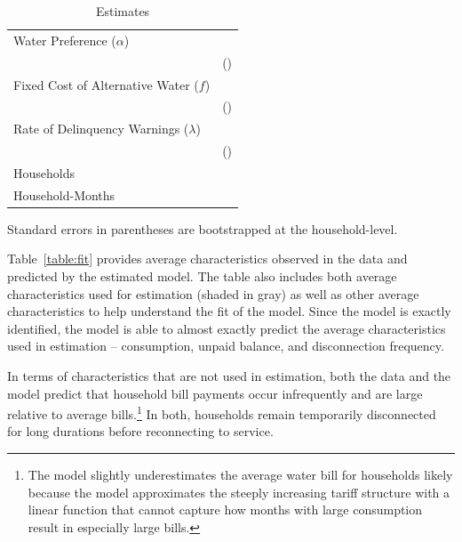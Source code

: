 \documentclass[12pt,table]{article}
\begin{document}
\begin{table}[h!]
\centering
\caption{Estimates}\label{table:estimates}
\begin{threeparttable}
\begin{tabular}{@{}l*{1}{c}@{}}
\toprule
Water Preference  ($\alpha$) &  \\
 &   (\unskip) \\[.4em]
Fixed Cost of Alternative Water ($f$) &   \\
 &    (\unskip) \\[.4em]
Rate of Delinquency Warnings ($\lambda$) &   \\
 &   (\unskip) \\[.8em]
Households &   \\
Household-Months &   \\
\bottomrule
\end{tabular}
\begin{tablenotes}
\item 
\footnotesize
Standard errors in parentheses are bootstrapped at the household-level. 
\end{tablenotes}
\end{threeparttable}
\end{table}

Table~\ref{table:fit} provides average characteristics observed in the data and predicted by the estimated model.  The table also includes both average characteristics used for estimation (shaded in gray) as well as other average characteristics to help understand the fit of the model.  Since the model is exactly identified, the model is able to almost exactly predict the average characteristics used in estimation -- consumption, unpaid balance, and disconnection frequency.

In terms of characteristics that are not used in estimation, both the data and the model predict that household bill payments occur infrequently and are large relative to average bills.\footnote{The model slightly underestimates the average water bill for households likely because the model approximates the steeply increasing tariff structure with a linear function that cannot capture how months with large consumption result in especially large bills.}  In both, households remain temporarily disconnected for long durations before reconnecting to service.  
\end{document}
